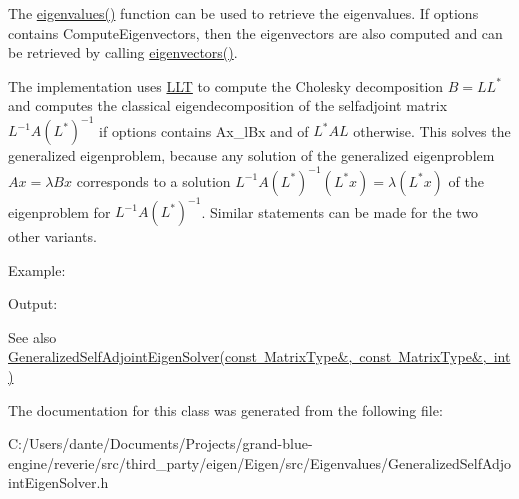 The \mbox{\hyperlink{class_eigen_1_1_self_adjoint_eigen_solver_a8efab27e82aa6aa0ae0c64739238c2e0}{eigenvalues()}} function can be used to retrieve the eigenvalues. If {\ttfamily options} contains Compute\+Eigenvectors, then the eigenvectors are also computed and can be retrieved by calling \mbox{\hyperlink{class_eigen_1_1_self_adjoint_eigen_solver_a7b9f7e641fa46ac4c5f2371405c69b2b}{eigenvectors()}}.

The implementation uses \mbox{\hyperlink{class_eigen_1_1_l_l_t}{L\+LT}} to compute the Cholesky decomposition $ B = LL^* $ and computes the classical eigendecomposition of the selfadjoint matrix $ L^{-1} A (L^*)^{-1} $ if {\ttfamily options} contains Ax\+\_\+l\+Bx and of $ L^{*} A L $ otherwise. This solves the generalized eigenproblem, because any solution of the generalized eigenproblem $ Ax = \lambda B x $ corresponds to a solution $ L^{-1} A (L^*)^{-1} (L^* x) = \lambda (L^* x) $ of the eigenproblem for $ L^{-1} A (L^*)^{-1} $. Similar statements can be made for the two other variants.

Example\+: 
\begin{DoxyCodeInclude}{0}
\end{DoxyCodeInclude}
 Output\+: 
\begin{DoxyVerbInclude}
\end{DoxyVerbInclude}


\begin{DoxySeeAlso}{See also}
\mbox{\hyperlink{class_eigen_1_1_generalized_self_adjoint_eigen_solver_addc0409c9cb1a5ac9cbbd00efe68908e}{Generalized\+Self\+Adjoint\+Eigen\+Solver(const Matrix\+Type\&, const Matrix\+Type\&, int)}} 
\end{DoxySeeAlso}


The documentation for this class was generated from the following file\+:\begin{DoxyCompactItemize}
\item 
C\+:/\+Users/dante/\+Documents/\+Projects/grand-\/blue-\/engine/reverie/src/third\+\_\+party/eigen/\+Eigen/src/\+Eigenvalues/Generalized\+Self\+Adjoint\+Eigen\+Solver.\+h\end{DoxyCompactItemize}
